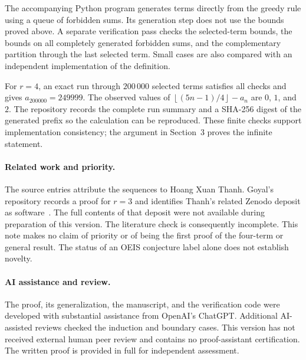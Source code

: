 \documentclass[11pt]{article}
\theoremstyle{remark}
\newcommand{\floor}[1]{\left\lfloor #1\right\rfloor}
\begin{document}
The accompanying Python program generates terms directly from the greedy
rule using a queue of forbidden sums. Its generation step does not use the
bounds proved above. A separate verification pass checks the selected-term
bounds, the bounds on all completely generated forbidden sums, and the
complementary partition through the last selected term. Small cases are
also compared with an independent implementation of the definition.

For $r=4$, an exact run through $200\,000$ selected terms satisfies all
checks and gives $a_{200000}=249999$. The observed values of
$\floor{(5n-1)/4}-a_n$ are $0$, $1$, and $2$. The repository records the
complete run summary and a SHA-256 digest of the generated prefix so the
calculation can be reproduced. These finite checks support implementation
consistency; the argument in Section~3 proves the infinite statement.

\paragraph{Related work and priority.}
The source entries attribute the sequences to Hoang Xuan Thanh. Goyal's
repository records a proof for $r=3$ and identifies Thanh's related
Zenodo deposit as software~\cite{goyal,thanhsoftware}. The full contents of
that deposit were not available during preparation of this version. The
literature check is consequently incomplete. This note makes no claim of
priority or of being the first proof of the four-term or general result.
The status of an OEIS conjecture label alone does not establish novelty.

\paragraph{AI assistance and review.}
The proof, its generalization, the manuscript, and the verification code
were developed with substantial assistance from OpenAI's ChatGPT.
Additional AI-assisted reviews checked the induction and boundary cases.
This version has not received external human peer review and contains no
proof-assistant certification. The written proof is provided in full for
independent assessment.
\end{document}
